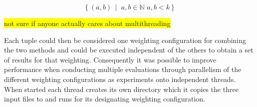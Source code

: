 \[ \left\{ (a, b) \,\middle|\, \, a,b \in \mathbb{N}\, \, a,b < k \right\} \]


\colorbox{yellow}{not sure if anyone actually cares about multithreading}

\noindent
Each tuple could then be considered one weighting configuration for combining the two methods and could be executed independent of the others to obtain a set of results for that weighting. Consequently it was possible to improve performance when conducting multiple evaluations through parallelism of the different weighting configurations as experiments onto independent threads. When started each thread creates its own directory which it copies the three input files to and runs for its designating weighting configuration. 


